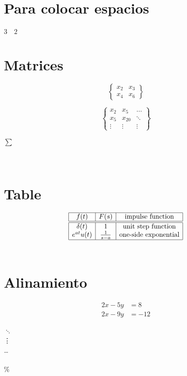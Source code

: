 \documentclass{article}
\begin{document}
	\section*{Para colocar espacios}
	$3 \quad 2$
	\section*{Matrices}
	\[
	\begin{Bmatrix}
		x_{2} & x_{3}\\
		x_{4} & x_{6}
	\end{Bmatrix}
	\]
	
	\[  
	\begin{Bmatrix}
	x_{2} & x_{5} & \dots\\
	x_{5} & x_{20} & \ddots\\
	\vdots & \vdots & \vdots
	\end{Bmatrix}
	\]
	
	$\sum$ \\ \\ \\
	
	\section*{Table}
	\[
	\begin{array}{|c|c|c|}
	\hline
	f(t) & F(s) &\mbox{impulse function}\\
	\hline\hline\delta(t) & 1 & \mbox{unit step function}\\
	e^{at}u(t) &  \frac{1}{s-a} &  \mbox{one-side exponential}\\
	\hline
	\end{array}
	\]
	\\ 
	\section*{Alinamiento}
	
	\begin{align}
	2x - 5y &= 8\\
	2x - 9y &= -12
	\end{align}
	
	$\ddots$\\
	\vdots\\
	\dots \\ \\
	\% %
\end{document}
